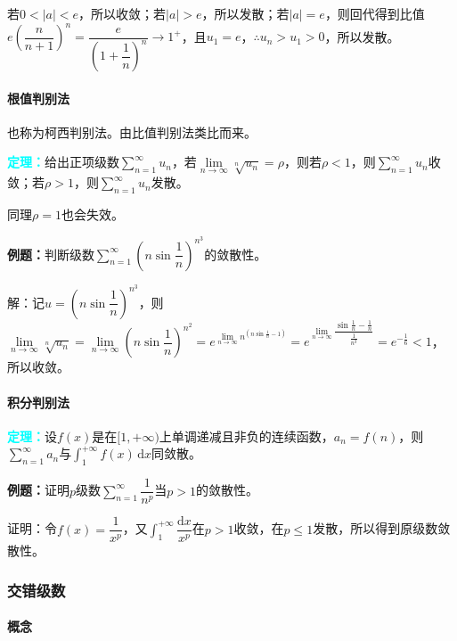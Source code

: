 \documentclass[UTF8, 12pt]{ctexart}
\begin{document}
若$0<\vert a\vert<e$，所以收敛；若$\vert a\vert>e$，所以发散；若$\vert a\vert=e$，则回代得到比值$e\left(\dfrac{n}{n+1}\right)^n=\dfrac{e}{(1+\dfrac{1}{n})^n}\to1^+$，且$u_1=e$，$\therefore u_n>u_1>0$，所以发散。

\paragraph{根值判别法} \leavevmode \medskip

也称为柯西判别法。由比值判别法类比而来。

\textcolor{aqua}{\textbf{定理：}}给出正项级数$\sum\limits_{n=1}^\infty u_n$，若$\lim\limits_{n\to\infty}\sqrt[n]{u_n}=\rho$，则若$\rho<1$，则$\sum\limits_{n=1}^\infty u_n$收敛；若$\rho>1$，则$\sum\limits_{n=1}^\infty u_n$发散。

同理$\rho=1$也会失效。

\textbf{例题：}判断级数$\sum\limits_{n=1}^\infty\left(n\sin\dfrac{1}{n}\right)^{n^3}$的敛散性。

解：记$u=\left(n\sin\dfrac{1}{n}\right)^{n^3}$，则$\lim\limits_{n\to\infty}\sqrt[n]{u_n}=\lim\limits_{n\to\infty}\left(n\sin\dfrac{1}{n}\right)^{n^2}=e^{\lim\limits_{n\to\infty}n^(n\sin\frac{1}{n}-1)}=e^{\lim\limits_{n\to\infty}\dfrac{\sin\frac{1}{n}-\frac{1}{n}}{\frac{1}{n^3}}}=e^{-\frac{1}{6}}<1$，所以收敛。

\paragraph{积分判别法} \leavevmode \medskip

\textcolor{aqua}{\textbf{定理：}}设$f(x)$是在$[1,+\infty)$上单调递减且非负的连续函数，$a_n=f(n)$，则$\sum\limits_{n=1}^\infty a_n$与$\int_1^{+\infty}f(x)\,\textrm{d}x$同敛散。

\textbf{例题：}证明$p$级数$\sum\limits_{n=1}^\infty\dfrac{1}{n^p}$当$p>1$的敛散性。

证明：令$f(x)=\dfrac{1}{x^p}$，又$\int_1^{+\infty}\dfrac{\textrm{d}x}{x^p}$在$p>1$收敛，在$p\leqslant1$发散，所以得到原级数敛散性。

\subsubsection{交错级数}

\paragraph{概念} \leavevmode \medskip
\end{document}
